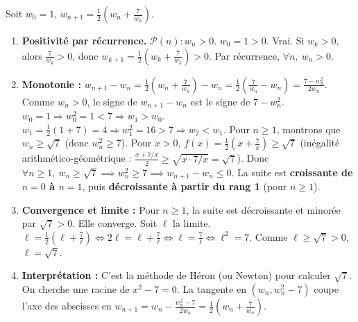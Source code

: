 \documentclass[11pt]{article}
\begin{document}
\begin{corrige}
Soit $w_0 = 1$, $w_{n+1} = \frac{1}{2}\left(w_n + \frac{7}{w_n}\right)$.
\begin{enumerate}
    \item \textbf{Positivité par récurrence.}
    $\mathcal{P}(n) : w_n > 0$.
    $w_0 = 1 > 0$. Vrai.
    Si $w_k > 0$, alors $\frac{7}{w_k} > 0$, donc $w_{k+1} = \frac{1}{2}(w_k + \frac{7}{w_k}) > 0$.
    Par récurrence, $\forall n,\ w_n > 0$.
    \item \textbf{Monotonie :}
    $w_{n+1} - w_n = \frac{1}{2}\left(w_n + \frac{7}{w_n}\right) - w_n = \frac{1}{2}\left(\frac{7}{w_n} - w_n\right) = \frac{7 - w_n^2}{2w_n}$.
    Comme $w_n > 0$, le signe de $w_{n+1} - w_n$ est le signe de $7 - w_n^2$.
    $w_0 = 1 \Rightarrow w_0^2 = 1 < 7 \Rightarrow w_1 > w_0$.
    $w_1 = \frac{1}{2}(1+7) = 4 \Rightarrow w_1^2 = 16 > 7 \Rightarrow w_2 < w_1$.
    Pour $n \ge 1$, montrons que $w_n \ge \sqrt{7}$ (donc $w_n^2 \ge 7$).
    Pour $x > 0$, $f(x) = \frac{1}{2}(x + \frac{7}{x}) \ge \sqrt{7}$ (inégalité arithmético-géométrique : $\frac{x + 7/x}{2} \ge \sqrt{x \cdot 7/x} = \sqrt{7}$).
    Donc $\forall n \ge 1,\ w_n \ge \sqrt{7} \implies w_n^2 \ge 7 \implies w_{n+1} - w_n \le 0$.
    La suite est \textbf{croissante de $n=0$ à $n=1$}, puis \textbf{décroissante à partir du rang 1} (pour $n \ge 1$).
    \item \textbf{Convergence et limite :}
    Pour $n \ge 1$, la suite est décroissante et minorée par $\sqrt{7} > 0$. Elle converge.
    Soit $\ell$ la limite. $\ell = \frac{1}{2}(\ell + \frac{7}{\ell}) \iff 2\ell = \ell + \frac{7}{\ell} \iff \ell = \frac{7}{\ell} \iff \ell^2 = 7$.
    Comme $\ell \ge \sqrt{7} > 0$, $\ell = \sqrt{7}$.
    \item \textbf{Interprétation :} C'est la méthode de Héron (ou Newton) pour calculer $\sqrt{7}$. On cherche une racine de $x^2 - 7 = 0$. La tangente en $(w_n, w_n^2-7)$ coupe l'axe des abscisses en $w_{n+1} = w_n - \frac{w_n^2-7}{2w_n} = \frac{1}{2}(w_n + \frac{7}{w_n})$.
\end{enumerate}
\end{corrige}
\end{document}
